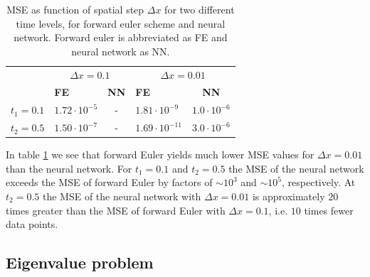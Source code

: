 \documentclass[12pt]{extarticle}
\begin{document}
\begin{table}[h]
	\centering
	\begin{tabular}{l|cc|cc|}
		\cline{2-5}
		& \multicolumn{2}{c|}{\textbf{$\Delta x=0.1$}}           & \multicolumn{2}{c|}{\textbf{$\Delta x=0.01$}}           \\ \cline{2-5} 
		& \multicolumn{1}{l|}{\textbf{FE}}         & \textbf{NN} & \multicolumn{1}{l|}{\textbf{FE}}          & \textbf{NN} \\ \hline
		\multicolumn{1}{|l|}{\textbf{$t_1=0.1$}} & \multicolumn{1}{l|}{$1.72\cdot 10^{-5}$} & -            & \multicolumn{1}{l|}{$1.81\cdot 10^{-9}$}  & $1.0\cdot10^{-6}$            \\ \hline
		\multicolumn{1}{|l|}{\textbf{$t_2=0.5$}} & \multicolumn{1}{l|}{$1.50\cdot 10^{-7}$} & -            & \multicolumn{1}{l|}{$1.69\cdot 10^{-11}$} & $3.0\cdot10^{-6}$             \\ \hline
	\end{tabular}
\caption{MSE as function of spatial step $\Delta x$ for two different time levels, for forward euler scheme and neural network. Forward euler is abbreviated as FE and neural network as NN.}
\label{tab:MSE_compare}
\end{table}

In table \ref{tab:MSE_compare} we see that forward Euler yields much lower MSE values for $\Delta x = 0.01$ than the neural network. For $t_1=0.1$ and $t_2=0.5$ the MSE of the neural network exceeds the MSE of forward Euler by factors of $\sim10^3$ and $\sim10^5$, respectively. At $t_2=0.5$ the MSE of the neural network with $\Delta x = 0.01$ is approximately $20$ times greater than the MSE of forward Euler with $\Delta x=0.1$, i.e. $10$ times fewer data points. 

\subsection{Eigenvalue problem}
\end{document}
